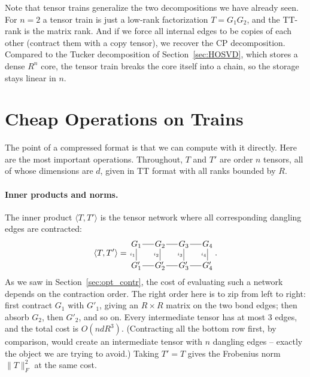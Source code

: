Note that tensor trains generalize the two decompositions we have already seen.
For $n=2$ a tensor train is just a low-rank factorization $T = G_1 G_2$,
and the TT-rank is the matrix rank.
And if we force all internal edges to be copies of each other (contract them with a copy tensor), we recover the CP decomposition.
Compared to the Tucker decomposition of Section~\ref{sec:HOSVD}, which stores a dense $R^n$ core,
the tensor train breaks the core itself into a chain, so the storage stays linear in $n$.

\section{Cheap Operations on Trains}

The point of a compressed format is that we can compute with it directly.
Here are the most important operations.
Throughout, $T$ and $T'$ are order $n$ tensors, all of whose dimensions are $d$, given in TT format with all ranks bounded by $R$.

\paragraph{Inner products and norms.}
The inner product $\langle T, T'\rangle$ is the tensor network where all corresponding dangling edges are contracted:
\[
   \langle T, T'\rangle
   =
   \begin{tikzpicture}[baseline=-.05em, inner sep=1pt]
      \node (G1) at (0,.45) {$G_1$};
      \node (G2) at (1,.45) {$G_2$};
      \node (G3) at (2,.45) {$G_3$};
      \node (G4) at (3,.45) {$G_4$};
      \node (H1) at (0,-.45) {$G'_1$};
      \node (H2) at (1,-.45) {$G'_2$};
      \node (H3) at (2,-.45) {$G'_3$};
      \node (H4) at (3,-.45) {$G'_4$};
      \draw (G1) -- (G2);
      \draw (G2) -- (G3);
      \draw (G3) -- (G4);
      \draw (H1) -- (H2);
      \draw (H2) -- (H3);
      \draw (H3) -- (H4);
      \draw (G1) -- (H1) node[midway, left, font=\tiny] {$i_1$};
      \draw (G2) -- (H2) node[midway, left, font=\tiny] {$i_2$};
      \draw (G3) -- (H3) node[midway, left, font=\tiny] {$i_3$};
      \draw (G4) -- (H4) node[midway, left, font=\tiny] {$i_4$};
   \end{tikzpicture}
   \,.
\]
As we saw in Section~\ref{sec:opt_contr}, the cost of evaluating such a network depends on the contraction order.
The right order here is to zip from left to right:
first contract $G_1$ with $G'_1$, giving an $R\times R$ matrix on the two bond edges;
then absorb $G_2$, then $G'_2$, and so on.
Every intermediate tensor has at most 3 edges,
and the total cost is $O(n d R^3)$.
(Contracting all the bottom row first, by comparison, would create an intermediate tensor with $n$ dangling edges -- exactly the object we are trying to avoid.)
Taking $T' = T$ gives the Frobenius norm $\|T\|_F^2$ at the same cost.

